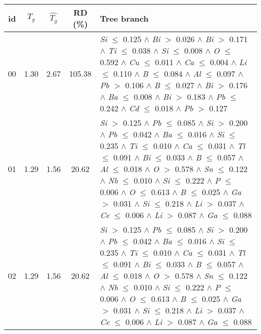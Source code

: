 \begin{table}[!htbp]
	\setlength{\tabcolsep}{3pt}
	\begin{tabular}{ccccm{}}
		\toprule
		id & $T_g$ & $\hat{T_g}$ & RD (\%) & Tree branch\\
		\midrule
		00 & 1.30 & 2.67 & 105.38 & \textit{Si} $\le$ 0.125 $\wedge$ \textit{Bi} $>$ 0.026 $\wedge$ \textit{Bi} $>$ 0.171 $\wedge$ \textit{Ti} $\le$ 0.038 $\wedge$ \textit{Si} $\le$ 0.008 $\wedge$ \textit{O} $\le$ 0.592 $\wedge$ \textit{Cu} $\le$ 0.011 $\wedge$ \textit{Ca} $\le$ 0.004 $\wedge$ \textit{Li} $\le$ 0.110 $\wedge$ \textit{B} $\le$ 0.084 $\wedge$ \textit{Al} $\le$ 0.097 $\wedge$ \textit{Pb} $>$ 0.106 $\wedge$ \textit{B} $\le$ 0.027 $\wedge$ \textit{Bi} $>$ 0.176 $\wedge$ \textit{Ba} $\le$ 0.008 $\wedge$ \textit{Bi} $>$ 0.183 $\wedge$ \textit{Pb} $\le$ 0.242 $\wedge$ \textit{Cd} $\le$ 0.018 $\wedge$ \textit{Pb} $>$ 0.127\\
		\hline
		01 & 1.29 & 1.56 & 20.62 & \textit{Si} $>$ 0.125 $\wedge$ \textit{Pb} $\le$ 0.085 $\wedge$ \textit{Si} $>$ 0.200 $\wedge$ \textit{Pb} $\le$ 0.042 $\wedge$ \textit{Ba} $\le$ 0.016 $\wedge$ \textit{Si} $\le$ 0.235 $\wedge$ \textit{Ti} $\le$ 0.010 $\wedge$ \textit{Ca} $\le$ 0.031 $\wedge$ \textit{Tl} $\le$ 0.091 $\wedge$ \textit{Bi} $\le$ 0.033 $\wedge$ \textit{B} $\le$ 0.057 $\wedge$ \textit{Al} $\le$ 0.018 $\wedge$ \textit{O} $>$ 0.578 $\wedge$ \textit{Sn} $\le$ 0.122 $\wedge$ \textit{Nb} $\le$ 0.010 $\wedge$ \textit{Si} $\le$ 0.222 $\wedge$ \textit{P} $\le$ 0.006 $\wedge$ \textit{O} $\le$ 0.613 $\wedge$ \textit{B} $\le$ 0.025 $\wedge$ \textit{Ga} $>$ 0.031 $\wedge$ \textit{Si} $\le$ 0.218 $\wedge$ \textit{Li} $>$ 0.037 $\wedge$ \textit{Ce} $\le$ 0.006 $\wedge$ \textit{Li} $>$ 0.087 $\wedge$ \textit{Ga} $\le$ 0.088\\
		\hline
		02 & 1.29 & 1.56 & 20.62 & \textit{Si} $>$ 0.125 $\wedge$ \textit{Pb} $\le$ 0.085 $\wedge$ \textit{Si} $>$ 0.200 $\wedge$ \textit{Pb} $\le$ 0.042 $\wedge$ \textit{Ba} $\le$ 0.016 $\wedge$ \textit{Si} $\le$ 0.235 $\wedge$ \textit{Ti} $\le$ 0.010 $\wedge$ \textit{Ca} $\le$ 0.031 $\wedge$ \textit{Tl} $\le$ 0.091 $\wedge$ \textit{Bi} $\le$ 0.033 $\wedge$ \textit{B} $\le$ 0.057 $\wedge$ \textit{Al} $\le$ 0.018 $\wedge$ \textit{O} $>$ 0.578 $\wedge$ \textit{Sn} $\le$ 0.122 $\wedge$ \textit{Nb} $\le$ 0.010 $\wedge$ \textit{Si} $\le$ 0.222 $\wedge$ \textit{P} $\le$ 0.006 $\wedge$ \textit{O} $\le$ 0.613 $\wedge$ \textit{B} $\le$ 0.025 $\wedge$ \textit{Ga} $>$ 0.031 $\wedge$ \textit{Si} $\le$ 0.218 $\wedge$ \textit{Li} $>$ 0.037 $\wedge$ \textit{Ce} $\le$ 0.006 $\wedge$ \textit{Li} $>$ 0.087 $\wedge$ \textit{Ga} $\le$ 0.088\\

\end{tabular}
\end{table}
